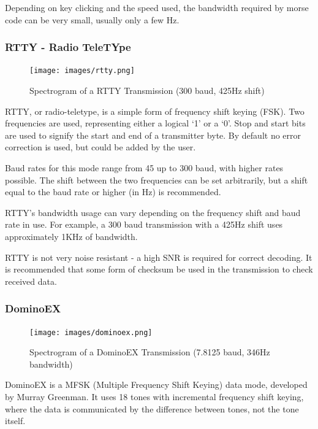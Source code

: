 \documentclass[a4paper,12pt]{article}
\begin{document}
Depending on key clicking and the speed used, the bandwidth required by morse code can be very small, usually only a few Hz.

\subsubsection*{RTTY - Radio TeleTYpe}
\begin{figure}[h]
  \begin{center}
    \texttt{[image: images/rtty.png]}
  \end{center}
  \caption{Spectrogram of a RTTY Transmission (300 baud, 425Hz shift)}
  \label{fig:rtty}
\end{figure}
RTTY, or radio-teletype, is a simple form of frequency shift keying (FSK). Two frequencies are used, representing either a logical `1' or a `0'. Stop and start bits are used to signify the start and end of a transmitter byte. By default no error correction is used, but could be added by the user.

Baud rates for this mode range from 45 up to 300 baud, with higher rates possible. The shift between the two frequencies can be set arbitrarily, but a shift equal to the baud rate or higher (in Hz) is recommended.

RTTY's bandwidth usage can vary depending on the frequency shift and baud rate in use. For example, a 300 baud transmission with a 425Hz shift uses approximately 1KHz of bandwidth. 

RTTY is not very noise resistant - a high SNR is required for correct decoding. It is recommended that some form of checksum be used in the transmission to check received data.

\subsubsection*{DominoEX}
\begin{figure}[h]
  \begin{center}
    \texttt{[image: images/dominoex.png]}
  \end{center}
  \caption{Spectrogram of a DominoEX Transmission (7.8125 baud, 346Hz bandwidth)}
  \label{fig:dominoex}
\end{figure}
DominoEX is a MFSK (Multiple Frequency Shift Keying) data mode, developed by Murray Greenman\citep{ref:dominoex}. It uses 18 tones with incremental frequency shift keying, where the data is communicated by the difference between tones, not the tone itself.
\end{document}
